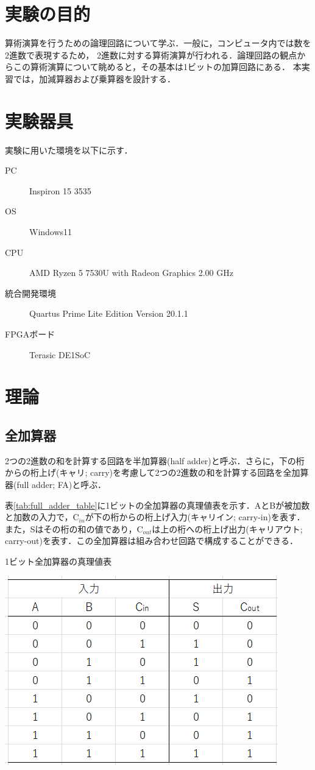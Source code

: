 \documentclass{jlreq}
\numberwithin{equation}{section}
\begin{document}
\tableofcontents
\clearpage

\section{実験の目的}
算術演算を行うための論理回路について学ぶ．一般に，コンピュータ内では数を2進数で表現するため，
2進数に対する算術演算が行われる．論理回路の観点からこの算術演算について眺めると，その基本は1ビットの加算回路にある．
本実習では，加減算器および乗算器を設計する．

\section{実験器具}
実験に用いた環境を以下に示す．
\begin{description}
  \item[PC] Inspiron 15 3535
  \item[OS] Windows11
  \item[CPU] AMD Ryzen 5 7530U with Radeon Graphics 2.00 GHz
  \item[統合開発環境] Quartus Prime Lite Edition Version 20.1.1
  \item[FPGAボード] Terasic DE1SoC
\end{description}

\section{理論}
\subsection{全加算器}
2つの2進数の和を計算する回路を半加算器(half adder)と呼ぶ．さらに，下の桁からの桁上げ(キャリ; carry)を考慮して2つの2進数の和を計算する回路を全加算器(full adder; FA)と呼ぶ．

表\ref{tab:full_adder_table}に1ビットの全加算器の真理値表を示す．AとBが被加数と加数の入力で，$\text{C}_{in}$が下の桁からの桁上げ入力(キャリイン; carry-in)を表す．
また，Sはその桁の和の値であり，$\text{C}_{out}$は上の桁への桁上げ出力(キャリアウト; carry-out)を表す．この全加算器は組み合わせ回路で構成することができる．
\begin{table}[H]
  \centering
  \caption{1ビット全加算器の真理値表}
  \includegraphics{assets/full_adder_table.png}
  \label{tab:full_adder_table}
\end{table}
\end{document}
